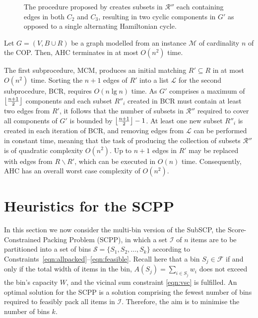 \documentclass{IEEEtran}
\begin{document}
\begin{figure}[h!]
	\centering	
	\subfloat[]{
	\label{fig:bcrerror}}
	\hspace{5mm}
	\subfloat[]{
	\label{fig:mpsconnecterror}}
	\hspace{5mm}
	\subfloat[]{
	\label{fig:mpscycleerror}}
	\caption{The procedure proposed by \cite{becker2010} creates subsets in $\mathcal{R}''$ each containing edges in both $C_2$ and $C_3$, resulting in two cyclic components in $G'$ as opposed to a single alternating Hamiltonian cycle.}	
	\label{fig:overlaperror}
\end{figure}

\begin{theorem}
	Let $G=(V, B \cup R)$ be a graph modelled from an instance $\mathcal{M}$ of cardinality $n$ of the COP. Then, AHC terminates in at most $O(n^2)$ time.
	\label{thm:ahc}
\end{theorem}
\begin{IEEEproof}
	The first subprocedure, MCM, produces an initial matching $R' \subseteq R$ in at most $O(n^2)$ time. Sorting the $n+1$ edges of $R'$ into a list $\mathcal{L}$ for the second subprocedure, BCR, requires $O(n\lg n)$ time. As $G'$ comprises a maximum of $\floor*{\frac{n+1}{2}}$ components and each subset $R''_i$ created in BCR must contain at least two edges from $R'$, it follows that the number of subsets in $\mathcal{R}''$ required to cover all components of $G'$ is bounded by $\floor*{\frac{n+1}{2}}-1$. At least one new subset $R''_i$ is created in each iteration of BCR, and removing edges from $\mathcal{L}$ can be performed in constant time, meaning that the task of producing the collection of subsets $\mathcal{R}''$ is of quadratic complexity $O(n^2)$. Up to $n+1$ edges in $R'$ may be replaced with edges from $R \backslash R'$, which can be executed in $O(n)$ time. Consequently, AHC has an overall worst case complexity of $O(n^2)$. 
\end{IEEEproof}	

\section{Heuristics for the SCPP}
\label{sec:heur}
In this section we now consider the multi-bin version of the SubSCP, the Score-Constrained Packing Problem (SCPP), in which a set $\mathcal{I}$ of $n$ items are to be partitioned into a set of bins $\mathcal{S} = \{S_1, S_2,\dotsc,S_k\}$ according to Constraints~\eqref{eqn:allpacked}--\eqref{eqn:feasible}. Recall here that a bin $S_j \in \mathcal{F}$ if and only if the total width of items in the bin, $A(S_j) = \sum_{i \in S_j} w_i$ does not exceed the bin's capacity $W$, and the vicinal sum constraint \eqref{eqn:vsc} is fulfilled. An optimal solution for the SCPP is a solution comprising the fewest number of bins required to feasibly pack all items in $\mathcal{I}$. Therefore, the aim is to minimise the number of bins $k$.
\end{document}
